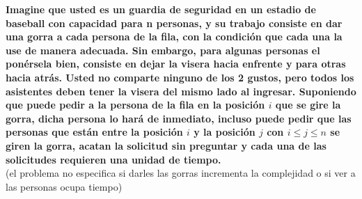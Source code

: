\textbf{Imagine que usted es un guardia de seguridad en un estadio de baseball con capacidad para n personas, y su trabajo consiste en dar una gorra a cada persona de la fila, con la condición que cada una la use de manera adecuada. Sin embargo, para algunas personas el ponérsela bien, consiste en dejar la visera hacia enfrente y para otras hacia atrás. Usted no comparte ninguno de los 2 gustos, pero todos los asistentes deben tener la visera del mismo lado al ingresar. Suponiendo que puede pedir a la persona de la fila en la posición $i$ que se gire la gorra, dicha persona lo hará de inmediato, incluso puede pedir que las personas que están entre la posición $i$ y la posición $j$ con $i\leq j \leq n$ se giren la gorra, acatan la solicitud sin preguntar y cada una de las solicitudes requieren una unidad de tiempo.}\\

(el problema no especifica si darles las gorras incrementa la complejidad o si ver a las personas ocupa tiempo)\\